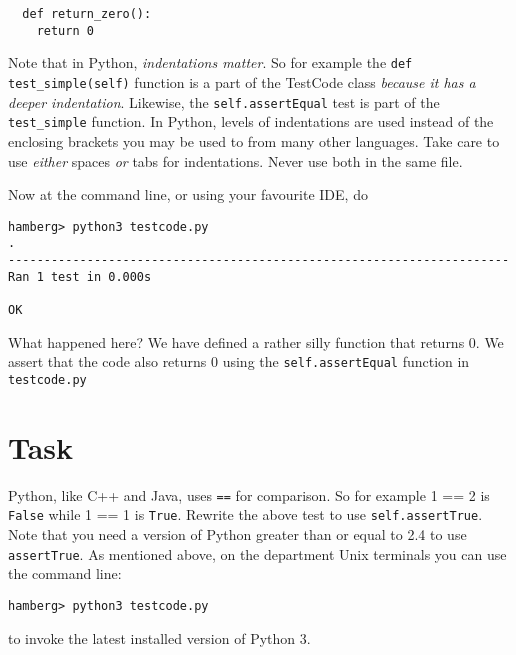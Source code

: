 \documentclass{paper}
\begin{document}
\begin{lstlisting}
  def return_zero():
    return 0
\end{lstlisting}
Note that in Python, \emph{indentations matter}. So for example the {\tt def
  test\_simple(self)} function is a part of the TestCode class \emph{because
  it has a deeper indentation}. Likewise, the {\tt self.assertEqual} test is
part of the {\tt test\_simple} function. In Python, levels of indentations are
used instead of the enclosing brackets you may be used to from many other
languages. Take care to use \emph{either} spaces \emph{or} tabs for
indentations. Never use both in the same file.

Now at the command line, or using your favourite IDE, do
\begin{verbatim}
hamberg> python3 testcode.py
.
----------------------------------------------------------------------
Ran 1 test in 0.000s

OK

\end{verbatim}
What happened here? We have defined a rather silly function that returns 0. We
assert that the code also returns 0 using the {\tt self.assertEqual} function
in {\tt testcode.py}
  
\section{Task}
Python, like C++ and Java, uses {\tt ==} for comparison. So for
example {1 == 2} is {\tt False} while {1 == 1} is {\tt True}. Rewrite
the above test to use {\tt self.assertTrue}. Note that you need a
version of Python greater than or equal to 2.4 to use {\tt
  assertTrue}. As mentioned above, on the department Unix terminals
you can use the command line:
\begin{verbatim}
hamberg> python3 testcode.py
\end{verbatim}
to invoke the latest installed version of Python 3.
\end{document}
